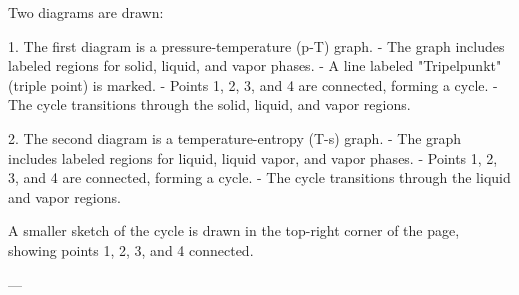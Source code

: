 Two diagrams are drawn:  

1. The first diagram is a pressure-temperature (p-T) graph.  
   - The graph includes labeled regions for solid, liquid, and vapor phases.  
   - A line labeled "Tripelpunkt" (triple point) is marked.  
   - Points 1, 2, 3, and 4 are connected, forming a cycle.  
   - The cycle transitions through the solid, liquid, and vapor regions.  

2. The second diagram is a temperature-entropy (T-s) graph.  
   - The graph includes labeled regions for liquid, liquid vapor, and vapor phases.  
   - Points 1, 2, 3, and 4 are connected, forming a cycle.  
   - The cycle transitions through the liquid and vapor regions.  

A smaller sketch of the cycle is drawn in the top-right corner of the page, showing points 1, 2, 3, and 4 connected.

---